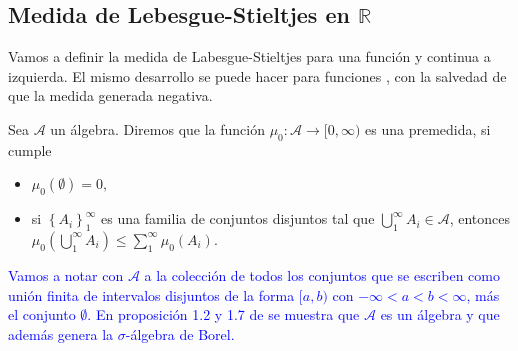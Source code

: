 \subsection{Medida de Lebesgue-Stieltjes en $\mathbb{R}$}
 
Vamos a definir la medida de Labesgue-Stieltjes para una función  y continua a izquierda. El mismo desarrollo se puede hacer para funciones , con la salvedad de que la medida generada  negativa.


\begin{defi}\label{def:premedida}
Sea $\mathcal{A}$ un álgebra. Diremos que la función $\mu_0:\mathcal{A}\to [0,\infty)$ es una premedida, si cumple 
 
 
\begin{itemize}
    \item $\mu_0(\emptyset)=0,$
    \item si $\displaystyle\left\{A_i\right\}_1^\infty$ es una familia de conjuntos disjuntos tal que $\displaystyle\bigcup_1^\infty A_i\in \mathcal{A}$, entonces $\displaystyle\mu_0\left(\bigcup_1^\infty A_i\right)\leq \sum_1^\infty \mu_0\left(A_i\right).$ 
\end{itemize}

\end{defi}
\textcolor{blue}{Vamos a notar con $\mathcal{A}$  a la colección de todos los conjuntos que se escriben como unión finita de intervalos disjuntos de la forma $[a,b)$ con $-\infty<a<b<\infty$, más el conjunto $\emptyset$. En proposición 1.2 y  1.7 de \cite{folland} se muestra que  $\mathcal{A}$ es un álgebra y que además genera la $\sigma$-álgebra de Borel.}



